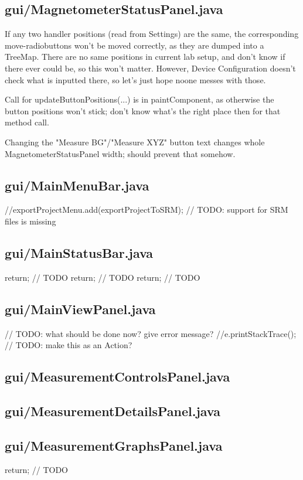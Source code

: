 \subsection{gui/MagnetometerStatusPanel.java}

If any two handler positions (read from Settings) are the same, the corresponding move-radiobuttons won't be moved correctly, as they are dumped into a TreeMap. There are no same positions in current lab setup, and don't know if there ever could be, so this won't matter. However, Device Configuration doesn't check what is inputted there, so let's just hope noone messes with those.

Call for updateButtonPositions(...) is in paintComponent, as otherwise the button positions won't stick; don't know what's the right place then for that method call.

Changing the "Measure BG"/"Measure XYZ" button text changes whole MagnetometerStatusPanel width; should prevent that somehow.

\subsection{gui/MainMenuBar.java}
            //exportProjectMenu.add(exportProjectToSRM);    // TODO: support for SRM files is missing

\subsection{gui/MainStatusBar.java}
        return; // TODO
        return; // TODO
        return; // TODO

\subsection{gui/MainViewPanel.java}
                    // TODO: what should be done now? give error message?
                    //e.printStackTrace();
        // TODO: make this as an Action?

\subsection{gui/MeasurementControlsPanel.java}

\subsection{gui/MeasurementDetailsPanel.java}

\subsection{gui/MeasurementGraphsPanel.java}
        return; // TODO

